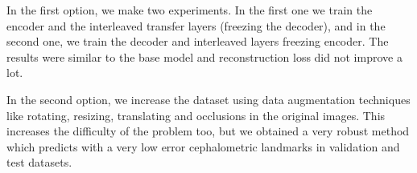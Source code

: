 \medskip

\noindent In the first option, we make two experiments. In the first one we train the encoder and the interleaved transfer layers (freezing the decoder), and in the second one, we train the decoder and interleaved layers freezing encoder. The results were similar to the base model and reconstruction loss did not improve a lot.

\medskip

\noindent In the second option, we increase the dataset using data augmentation techniques like rotating, resizing, translating and occlusions in the original images. This increases the difficulty of the problem too, but we obtained a very robust method which predicts with a very low error cephalometric landmarks in validation and test datasets.



\endinput
